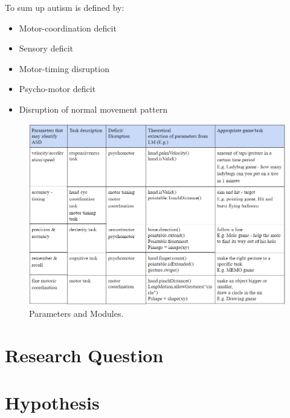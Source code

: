 \vspace{5mm} %
\hfill \break
To sum up autism is defined by:
\begin{itemize}
    \item Motor-coordination deficit
    \item Sensory deficit
    \item Motor-timing disruption
    \item Psycho-motor deficit
    \item Disruption of normal movement pattern
\end{itemize}



\begin{figure}[h]  %
  
  \includegraphics[width=1\textwidth]{figures/tableOfModules.png}
  \caption[Parameters and Modules.]{Parameters and Modules.}
  \label{fig:setup}
\end{figure}


\section{Research Question}
\label{sec:researchquestion}


\section{Hypothesis}
\label{sec:hypothesis}


